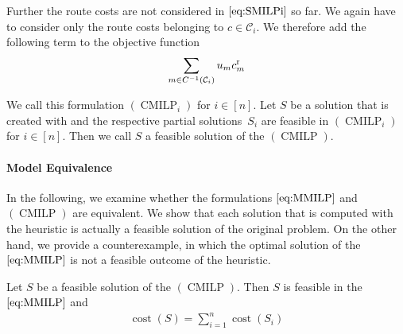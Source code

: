 Further the route costs are not considered in $\eqref{eq:SMILPi}$ so far. We again have to consider only the route costs belonging to $c\in\mathcal{C}_i$. We therefore add the following term to the objective function
\begin{align*}
	\sum_{m\in C^{-1}\left(\mathcal{C}_i\right)} u_m c^{\operatorname{r}}_m
\end{align*}

We call this formulation $(\operatorname{CMILP}_i)$ for $i\in[n]$. Let $S$ be a solution that is created with  and the respective partial solutions~$S_i$ are feasible in $(\operatorname{CMILP}_i)$ for ${i\in[n]}$. Then we call $S$ a feasible solution of the $(\operatorname{CMILP})$.

\paragraph{Model Equivalence} \parfill

In the following, we examine whether the formulations $\eqref{eq:MMILP}$ and $(\operatorname{CMILP})$ are equivalent. We show that each solution that is computed with the heuristic is actually a feasible solution of the original problem. On the other hand, we provide a counterexample, in which the optimal solution of the $\eqref{eq:MMILP}$ is not a feasible outcome of the heuristic.

\begin{theorem}
\label{thm:equivalence_CMILP_MMILP}

Let $S$ be a feasible solution of the $(\operatorname{CMILP})$. Then $S$ is feasible in the $\eqref{eq:MMILP}$ and
\begin{align*}
	\operatorname{cost}\left(S\right) = \sum_{i=1}^n\operatorname{cost}\left(S_i\right)
\end{align*}

\end{theorem}

